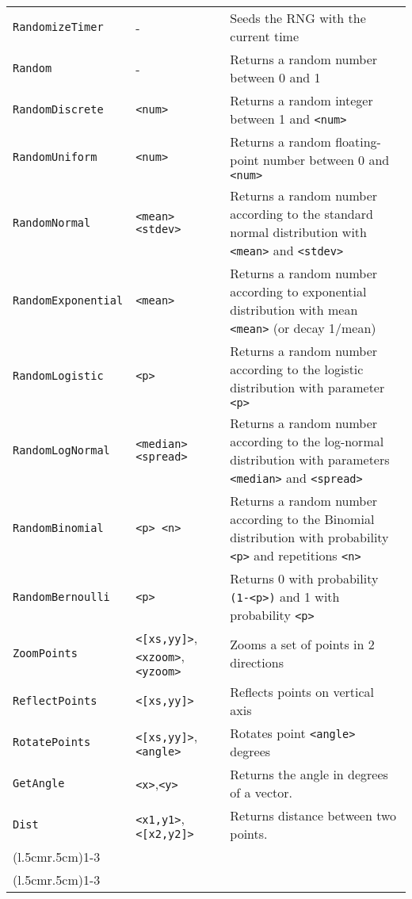 \begin{longtable}{p{3cm}p{3cm}p{6cm}}
\verb+RandomizeTimer+ & - & Seeds the RNG with the current time\\ 
\verb+Random+ & - & Returns a random number between 0 and 1\\ 
\verb+RandomDiscrete+ &\verb+<num>+ &Returns a random integer between 1 and \verb+<num>+ \\ 
\verb+RandomUniform+ &\verb+<num>+ &Returns a random floating-point number between 0 and \verb+<num>+ \\ 
\verb+RandomNormal+ &\verb+<mean> <stdev>+ &Returns a random number according to the standard normal distribution with \verb+<mean>+ and \verb+<stdev>+\\ 
\verb+RandomExponential+ &\verb+<mean>+ &Returns a random number according to exponential distribution with mean \verb+<mean>+ (or decay 1/mean)\\ 
\verb+RandomLogistic+ &\verb+<p>+ &Returns a random number according to the logistic distribution with parameter \verb+<p>+\\ 
\verb+RandomLogNormal+ &\verb+<median> <spread>+ &Returns a random number according to the log-normal distribution with parameters \verb+<median>+ and \verb+<spread>+\\ 
\verb+RandomBinomial+ &\verb+<p> <n>+&Returns a random number according to the Binomial distribution with probability \verb+<p>+ and repetitions \verb+<n>+\\ 
\verb+RandomBernoulli+ &\verb+<p>+ &Returns 0 with probability \verb+(1-<p>)+ and 1 with probability \verb+<p>+\\ 

\verb+ZoomPoints+&\verb+<[xs,yy]>+, \verb+<xzoom>+, \verb+<yzoom>+&Zooms a set of points in 2 directions\\
\verb+ReflectPoints+&\verb+<[xs,yy]>+&Reflects points on vertical axis\\
\verb+RotatePoints+ &\verb+<[xs,yy]>+,\verb+<angle>+&Rotates point \verb+<angle>+ degrees\\
\verb+GetAngle+&\verb+<x>+,\verb+<y>+&Returns the angle in degrees of a vector.\\
\verb+Dist+&\verb+<x1,y1>+,\verb+<[x2,y2]>+&Returns distance between two points.\\

\addlinespace[0.2cm] 

\cmidrule(l{.5cm}r{.5cm}){1-3} 
\multicolumn{3}{c}{\textbf{File/NetworkStream Functions}}\\ 
\cmidrule(l{.5cm}r{.5cm}){1-3} 


\end{longtable}
